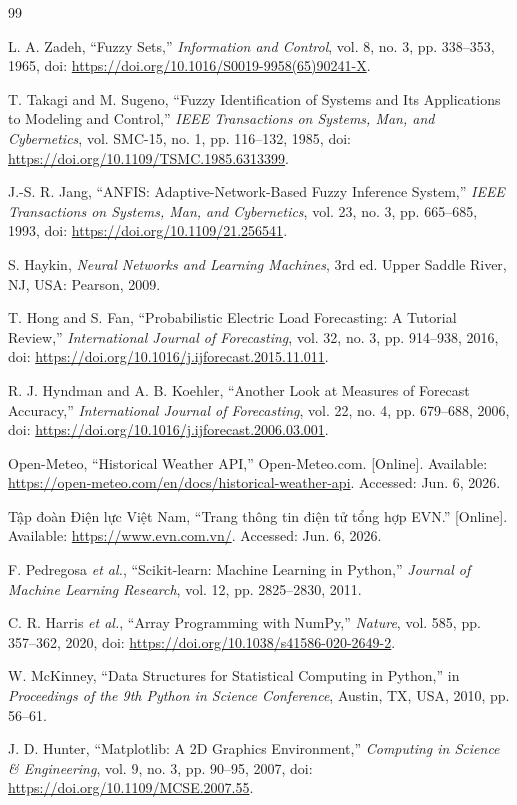 \renewcommand{\bibname}{TÀI LIỆU THAM KHẢO}
{}

\begin{thebibliography}{99}

L. A. Zadeh, ``Fuzzy Sets,'' \textit{Information and Control}, vol. 8, no. 3, pp. 338--353, 1965, doi: \url{https://doi.org/10.1016/S0019-9958(65)90241-X}.

T. Takagi and M. Sugeno, ``Fuzzy Identification of Systems and Its Applications to Modeling and Control,'' \textit{IEEE Transactions on Systems, Man, and Cybernetics}, vol. SMC-15, no. 1, pp. 116--132, 1985, doi: \url{https://doi.org/10.1109/TSMC.1985.6313399}.

J.-S. R. Jang, ``ANFIS: Adaptive-Network-Based Fuzzy Inference System,'' \textit{IEEE Transactions on Systems, Man, and Cybernetics}, vol. 23, no. 3, pp. 665--685, 1993, doi: \url{https://doi.org/10.1109/21.256541}.

S. Haykin, \textit{Neural Networks and Learning Machines}, 3rd ed. Upper Saddle River, NJ, USA: Pearson, 2009.

T. Hong and S. Fan, ``Probabilistic Electric Load Forecasting: A Tutorial Review,'' \textit{International Journal of Forecasting}, vol. 32, no. 3, pp. 914--938, 2016, doi: \url{https://doi.org/10.1016/j.ijforecast.2015.11.011}.

R. J. Hyndman and A. B. Koehler, ``Another Look at Measures of Forecast Accuracy,'' \textit{International Journal of Forecasting}, vol. 22, no. 4, pp. 679--688, 2006, doi: \url{https://doi.org/10.1016/j.ijforecast.2006.03.001}.

Open-Meteo, ``Historical Weather API,'' Open-Meteo.com. [Online]. Available: \url{https://open-meteo.com/en/docs/historical-weather-api}. Accessed: Jun. 6, 2026.

Tập đoàn Điện lực Việt Nam, ``Trang thông tin điện tử tổng hợp EVN.'' [Online]. Available: \url{https://www.evn.com.vn/}. Accessed: Jun. 6, 2026.

F. Pedregosa \textit{et al.}, ``Scikit-learn: Machine Learning in Python,'' \textit{Journal of Machine Learning Research}, vol. 12, pp. 2825--2830, 2011.

C. R. Harris \textit{et al.}, ``Array Programming with NumPy,'' \textit{Nature}, vol. 585, pp. 357--362, 2020, doi: \url{https://doi.org/10.1038/s41586-020-2649-2}.

W. McKinney, ``Data Structures for Statistical Computing in Python,'' in \textit{Proceedings of the 9th Python in Science Conference}, Austin, TX, USA, 2010, pp. 56--61.

J. D. Hunter, ``Matplotlib: A 2D Graphics Environment,'' \textit{Computing in Science \& Engineering}, vol. 9, no. 3, pp. 90--95, 2007, doi: \url{https://doi.org/10.1109/MCSE.2007.55}.

\end{thebibliography}
